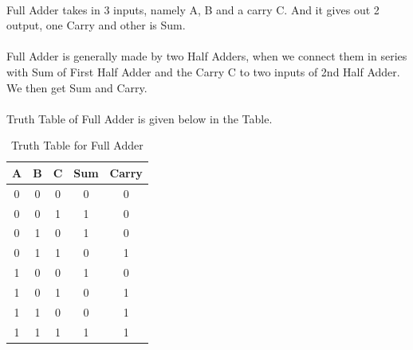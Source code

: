 \documentclass[12pt]{article}
\begin{document}
\paragraph{}
Full Adder takes in 3 inputs, namely A, B and a carry C. And it gives out 2 output, one Carry and other is Sum.

\paragraph{}
Full Adder is generally made by two Half Adders, when we connect them in series with Sum of First Half Adder and the Carry C to two inputs of 2nd Half Adder. We then get Sum and Carry.

\paragraph{}
Truth Table of Full Adder is given below in the Table.

\begin{table}
 \centering
\begin{tabular}{|c  c  c | c | c|} 
\hline  
A & B & C & Sum & Carry \\  
\hline  
0 & 0 & 0 & 0 & 0 \\  
0 & 0 & 1 & 1 & 0   \\  
0 & 1 & 0 & 1 & 0 \\ 
0 & 1 & 1 & 0 & 1 \\ 
1 & 0 & 0 & 1 & 0 \\  
1 & 0 & 1 & 0 & 1 \\
1 & 1 & 0 & 0 & 1 \\ 
1 & 1 & 1 & 1 & 1 \\ 
\hline
\end{tabular}
\caption{Truth Table for Full Adder}
\end{table}
\end{document}
